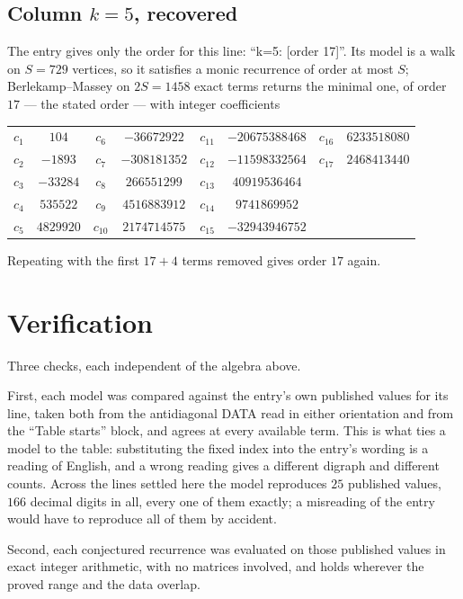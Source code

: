 \documentclass[11pt,a4paper]{article}
\theoremstyle{plain}
\theoremstyle{definition}
\begin{document}
\subsection*{Column $k=5$, recovered}
The entry gives only the order for this line: ``k=5: [order 17]''. Its model is a walk on
$S=729$ vertices, so it satisfies a monic recurrence of order at most $S$;
Berlekamp--Massey on $2S=1458$ exact terms returns the minimal one, of order
$17$ --- the stated order --- with integer coefficients
\begin{center}\small\begin{tabular}{cccccccc}
$c_{1}$ & $104$ & $c_{6}$ & $-36672922$ & $c_{11}$ & $-20675388468$ & $c_{16}$ & $6233518080$ \\
$c_{2}$ & $-1893$ & $c_{7}$ & $-308181352$ & $c_{12}$ & $-11598332564$ & $c_{17}$ & $2468413440$ \\
$c_{3}$ & $-33284$ & $c_{8}$ & $266551299$ & $c_{13}$ & $40919536464$ &  &  \\
$c_{4}$ & $535522$ & $c_{9}$ & $4516883912$ & $c_{14}$ & $9741869952$ &  &  \\
$c_{5}$ & $4829920$ & $c_{10}$ & $2174714575$ & $c_{15}$ & $-32943946752$ &  &  \\
\end{tabular}\end{center}
Repeating with the first $17+4$ terms removed gives order $17$ again.

\section{Verification}

Three checks, each independent of the algebra above.

First, each model was compared against the entry's own published values for its line, taken
both from the antidiagonal DATA read in either orientation and from the ``Table starts''
block, and agrees at every available term. This is what ties a model to the table:
substituting the fixed index into the entry's wording is a reading of English, and a wrong
reading gives a different digraph and different counts. Across the lines settled here the
model reproduces $25$ published values, $166$ decimal digits in all, every one of
them exactly; a misreading of the entry would have to reproduce all of them by accident.

Second, each conjectured recurrence was evaluated on those published values in exact
integer arithmetic, with no matrices involved, and holds wherever the proved range and the
data overlap.
\end{document}
